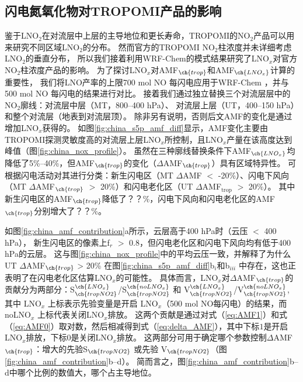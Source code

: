 \subsection{闪电氮氧化物对TROPOMI产品的影响}  \label{sec:lnox_affects_tropomi}

鉴于LNO$_2$在对流层中上层的主导地位和更长寿命，TROPOMI的NO$_2$产品可以用来研究不同区域LNO$_2$的分布。
然而官方的TROPOMI NO$_2$柱浓度并未详细考虑LNO$_2$的垂直分布，
所以我们接着利用WRF-Chem的模式结果研究了LNO$_x$对官方NO$_2$柱浓度产品的影响。
为了探讨LNO$_x$对AMF$_{\ch{trop}}$和AMF$_{\ch{LNO_x}}$计算的重要性，
我们将LNO产率的上限700 mol NO 每闪电\citep{Ott.2010}应用于WRF-Chem ，并与500 mol NO 每闪电的结果进行对比。
接着我们通过独立替换三个对流层层中的NO$_2$廓线：对流层中层（MT，800--400 hPa）、
对流层上层（UT，400--150 hPa）和整个对流层（地表到对流层顶）。
除非另有说明，否则后文AMF的变化是通过增加LNO$_x$获得的。
如图\ref{fig:china_s5p_amf_diff}显示，AMF变化主要由TROPOMI探测灵敏度高的对流层上层LNO$_x$所控制\citep{Beirle.2009,Laughner.2017}，且LNO$_x$产量在该高度达到峰值（图\ref{fig:china_nox_profile}）。
虽然在三种廓线替换条件下AMF$_{\ch{LNO_x}}$均降低了5\%--40\%，但AMF$_{\ch{trop}}$的变化（$\Delta$AMF$_{\ch{trop}}$）具有区域特异性。
可根据闪电活动对其进行分类：新生闪电区（MT $\Delta$AMF $<$ -20\%）、闪电下风向（MT $\Delta$AMF$_{\ch{trop}}$ $>$ 20\%）和闪电老化区（UT $\Delta$AMF$_\textrm{trop}$ $>$ 20\%）。
其中新生闪电区的AMF$_{\ch{trop}}$降低了？？\%，闪电下风向和闪电老化区的AMF$_{\ch{trop}}$分别增大了？？\%。

如图\ref{fig:china_amf_contribution}a所示，云层高于400 hPa时（云压 $<$ 400 hPa），
新生闪电区的像素上f$_r$ $>$ 0.8，但闪电老化区和闪电下风向均有低于400 hPa的云层。
这与图\ref{fig:china_nox_profile}中的平均云压一致，并解释了为什么UT $\Delta$AMF$_{\ch{trop}}$ > 20\% 在图\ref{fig:china_s5p_amf_diff}b$_i$和b$_{iii}$ 中存在，这也正表明了在闪电老化区估算LNO$_x$的可能性。
具体而言，LNO$_x$对$\Delta$AMF$_{\ch{trop}}$的贡献分为两部分：S$^{\ch{LNO_x}}_{\ch{tropNO2}}$/S$^{\ch{noLNO_x}}_{\ch{tropNO2}}$ 和 V$^{\ch{LNO_x}}_{\ch{tropNO2}}$/V$^{\ch{noLNO_x}}_{\ch{tropNO2}}$,
其中 LNO$_x$ 上标表示先验变量是开启 LNO$_x$（500 mol NO每闪电）的结果，而 noLNO$_x$ 上标代表关闭LNO$_x$排放。
这两个贡献是通过对式（\ref{eq:AMF1}）和式（\ref{eq:AMF0}）取对数，然后相减得到式（\ref{eq:delta_AMF}），其中下标$1$是开启LNO$_x$排放，下标$0$是关闭LNO$_x$排放。
这两部分可用于确定哪个参数控制$\Delta$AMF$_{\ch{trop}}$：增大的先验S$_{\ch{tropNO2}}$ 或先验 V$_{\ch{tropNO2}}$（图\ref{fig:china_amf_contribution}b--d）。
简而言之，图\ref{fig:china_amf_contribution}b--d中哪个比例的数值大，哪个占主导地位。

